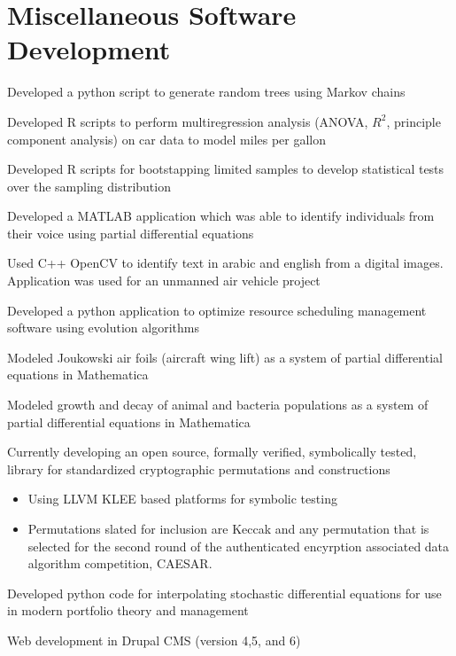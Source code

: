 \documentclass[letterpaper]{clinton-resume}
\begin{document}
\begin{minipage}[t]{0.66\textwidth}
\section{Miscellaneous Software Development}
\begin{tightitemize}
\item Developed a python script to generate random trees using Markov chains
\item Developed R scripts to perform multiregression analysis (ANOVA, $R^2$, principle component analysis)  on car data to model miles per gallon
\item Developed R scripts for bootstapping limited samples to develop statistical tests over the sampling distribution
\item Developed a MATLAB application which was able to identify individuals from their voice using partial differential equations
\item Used C++ OpenCV to identify text in arabic and english from a digital images.  Application was used for an unmanned air vehicle project
\item Developed a python application to optimize resource scheduling management software using evolution algorithms
\item Modeled Joukowski air foils (aircraft wing lift) as a system of partial differential equations in Mathematica
\item Modeled growth and decay of animal and bacteria populations as a system of partial differential equations in Mathematica
\end{tightitemize}
\vspace{\topsep}
\begin{tightitemize}
\item Currently developing an open source, formally verified, symbolically tested, library for standardized cryptographic permutations and constructions
	\begin{itemize}
	\item Using LLVM KLEE based platforms for symbolic testing
	\item Permutations slated for inclusion are Keccak and any permutation that is selected for the second round of the authenticated encyrption associated data algorithm competition, CAESAR.
	\end{itemize}
\item Developed python code for interpolating stochastic differential equations for use in modern portfolio theory and management
\item Web development in Drupal CMS (version 4,5, and 6)
\end{tightitemize}
\end{minipage}
\end{document}
